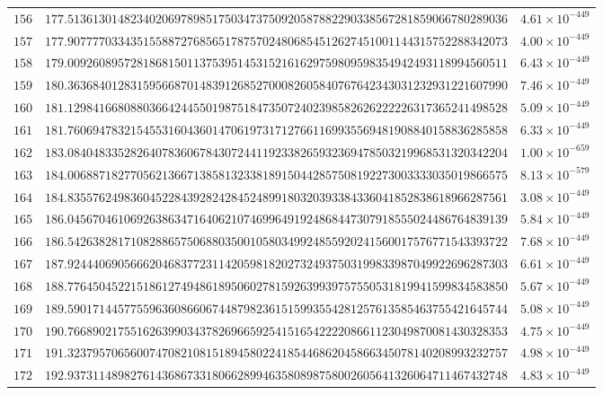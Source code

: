 \documentclass[12pt,reqno]{amsart}
\theoremstyle{remark}
\begin{document}
\begin{longtable}{clc}
$156$ & $177.5136130148234020697898517503473750920587882290338567281859066780289036$ & $4.61\times 10^{-449}$ \\
$157$ & $177.9077770334351558872768565178757024806854512627451001144315752288342073$ & $4.00\times 10^{-449}$ \\
$158$ & $179.0092608957281868150113753951453152161629759809598354942493118994560511$ & $6.43\times 10^{-449}$ \\
$159$ & $180.3636840128315956687014839126852700082605840767642343031232931221607990$ & $7.46\times 10^{-449}$ \\
$160$ & $181.1298416680880366424455019875184735072402398582626222226317365241498528$ & $5.09\times 10^{-449}$ \\
$161$ & $181.7606947832154553160436014706197317127661169935569481908840158836285858$ & $6.33\times 10^{-449}$ \\
$162$ & $183.0840483352826407836067843072441192338265932369478503219968531320342204$ & $1.00\times 10^{-659}$ \\
$163$ & $184.0068871827705621366713858132338189150442857508192273003333035019866575$ & $8.13\times 10^{-579}$ \\
$164$ & $184.8355762498360452284392824284524899180320393384336041852838618966287561$ & $3.08\times 10^{-449}$ \\
$165$ & $186.0456704610692638634716406210746996491924868447307918555024486764839139$ & $5.84\times 10^{-449}$ \\
$166$ & $186.5426382817108288657506880350010580349924855920241560017576771543393722$ & $7.68\times 10^{-449}$ \\
$167$ & $187.9244406905666204683772311420598182027324937503199833987049922696287303$ & $6.61\times 10^{-449}$ \\
$168$ & $188.7764504522151861274948618950602781592639939757550531819941599834583850$ & $5.67\times 10^{-449}$ \\
$169$ & $189.5901714457755963608660674487982361515993554281257613585463755421645744$ & $5.08\times 10^{-449}$ \\
$170$ & $190.7668902175516263990343782696659254151654222208661123049870081430328353$ & $4.75\times 10^{-449}$ \\
$171$ & $191.3237957065600747082108151894580224185446862045866345078140208993232757$ & $4.98\times 10^{-449}$ \\
$172$ & $192.9373114898276143686733180662899463580898758002605641326064711467432748$ & $4.83\times 10^{-449}$ \\

\end{longtable}
\end{document}
